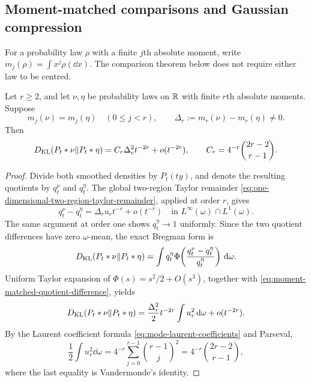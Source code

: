 \subsection{Moment-matched comparisons and Gaussian compression}

For a probability law \(\rho\) with a finite \(j\)th absolute moment, write
\(m_j(\rho)=\int x^j\rho(\dd x)\).  The comparison theorem below does not
require either law to be centred.

\begin{theorem}
\label{thm:moment-matched-poisson-kl}
Let \(r\ge2\), and let \(\nu,\eta\) be probability laws on \(\mathbb{R}\) with
finite \(r\)th absolute moments.  Suppose
\[
 m_j(\nu)=m_j(\eta)\quad(0\le j<r),
 \qquad \Delta_r:=m_r(\nu)-m_r(\eta)\ne0.
\]
Then
\begin{equation}\label{eq:moment-matched-poisson-kl}
 D_{\rm KL}(P_t*\nu\|P_t*\eta)
 =C_r\Delta_r^2t^{-2r}+o(t^{-2r}),
 \qquad
 C_r=4^{-r}\binom{2r-2}{r-1}.
\end{equation}
\end{theorem}

\begin{proof}
Divide both smoothed densities by \(P_t(ty)\), and denote the resulting
quotients by \(q_t^\nu\) and \(q_t^\eta\).  The global two-region Taylor
remainder \eqref{eq:one-dimensional-two-region-taylor-remainder}, applied
at order \(r\), gives
\begin{equation}\label{eq:moment-matched-quotient-difference}
 q_t^\nu-q_t^\eta
 =\Delta_r u_r t^{-r}+o(t^{-r})
 \quad\text{in }L^\infty(\omega)\cap L^1(\omega).
\end{equation}
The same argument at order one shows \(q_t^\eta\to1\) uniformly.  Since the
two quotient differences have zero \(\omega\)-mean, the exact Bregman form is
\[
 D_{\rm KL}(P_t*\nu\|P_t*\eta)
 =\int q_t^\eta
 \Phi\!\left(\frac{q_t^\nu-q_t^\eta}{q_t^\eta}\right)\,\mathrm{d}\omega.
\]
Uniform Taylor expansion of \(\Phi(s)=s^2/2+O(s^3)\), together with
\eqref{eq:moment-matched-quotient-difference}, yields
\[
 D_{\rm KL}(P_t*\nu\|P_t*\eta)
 =\frac{\Delta_r^2}{2}t^{-2r}\int u_r^2\,\mathrm{d}\omega+o(t^{-2r}).
\]
By the Laurent coefficient formula
\eqref{eq:mode-laurent-coefficients} and Parseval,
\[
 \frac12\int u_r^2\dd\omega
 =4^{-r}\sum_{j=0}^{r-1}\binom{r-1}{j}^2
 =4^{-r}\binom{2r-2}{r-1},
\]
where the last equality is Vandermonde's identity.
\end{proof}



